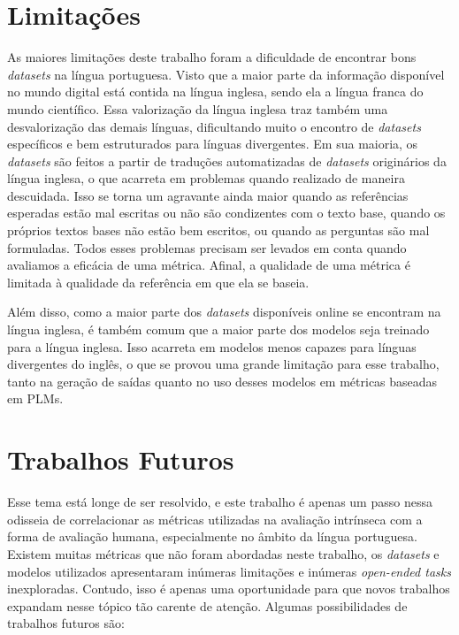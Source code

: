 \documentclass[cic,tc]{iiufrgs}
\begin{document}
\section{Limitações}
As maiores limitações deste trabalho foram a dificuldade de encontrar bons \textit{datasets} na língua portuguesa. Visto que a maior parte da informação disponível no mundo digital está contida na língua inglesa, sendo ela a língua franca do mundo científico. Essa valorização da língua inglesa traz também uma desvalorização das demais línguas, dificultando muito o encontro de \textit{datasets} específicos e bem estruturados para línguas divergentes. Em sua maioria, os \textit{datasets} são feitos a partir de traduções automatizadas de \textit{datasets} originários da língua inglesa, o que acarreta em problemas quando realizado de maneira descuidada. Isso se torna um agravante ainda maior quando as referências esperadas estão mal escritas ou não são condizentes com o texto base, quando os próprios textos bases não estão bem escritos, ou quando as perguntas são mal formuladas. Todos esses problemas precisam ser levados em conta quando avaliamos a eficácia de uma métrica. Afinal, a qualidade de uma métrica é limitada à qualidade da referência em que ela se baseia.

Além disso, como a maior parte dos \textit{datasets} disponíveis online se encontram na língua inglesa, é também comum que a maior parte dos modelos seja treinado para a língua inglesa. Isso acarreta em modelos menos capazes para línguas divergentes do inglês, o que se provou uma grande limitação para esse trabalho, tanto na geração de saídas quanto no uso desses modelos em métricas baseadas em PLMs.


\section{Trabalhos Futuros}
Esse tema está longe de ser resolvido, e este trabalho é apenas um passo nessa odisseia de correlacionar as métricas utilizadas na avaliação intrínseca com a forma de avaliação humana, especialmente no âmbito da língua portuguesa. Existem muitas métricas que não foram abordadas neste trabalho, os \textit{datasets} e modelos utilizados apresentaram inúmeras limitações e inúmeras \textit{open-ended tasks} inexploradas. Contudo, isso é apenas uma oportunidade para que novos trabalhos expandam nesse tópico tão carente de atenção. Algumas possibilidades de trabalhos futuros são:
\end{document}
